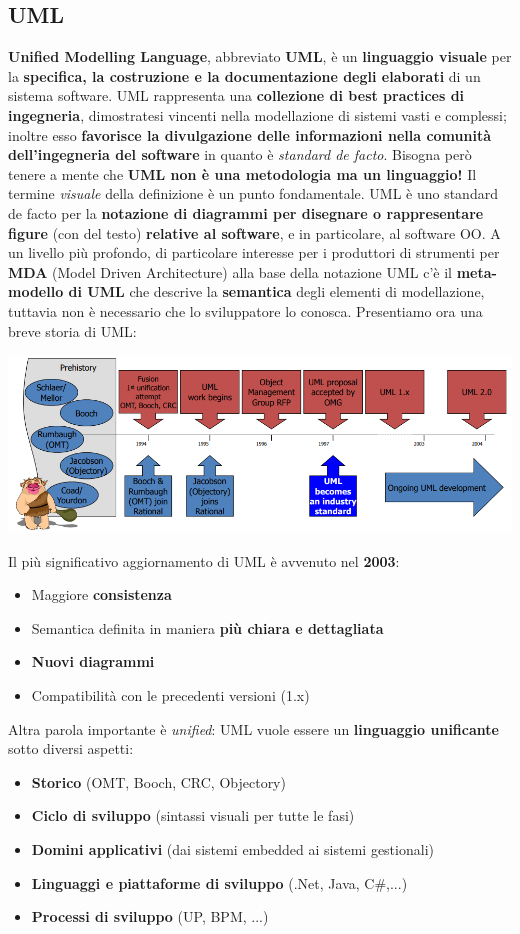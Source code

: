 \documentclass[12pt]{article}
\begin{document}
\subsection{UML}
\textbf{Unified Modelling Language}, abbreviato \textbf{UML}, è un \textbf{linguaggio visuale} per la \textbf{specifica, la costruzione e la documentazione degli elaborati} di un sistema software.
UML rappresenta una \textbf{collezione di best practices di ingegneria}, dimostratesi vincenti nella modellazione di sistemi vasti e complessi; inoltre esso \textbf{favorisce la divulgazione delle informazioni nella comunità dell'ingegneria del software} in quanto è \textit{standard de facto}.
Bisogna però tenere a mente che \textbf{UML non è una metodologia ma un linguaggio!} \newline
Il termine \textit{visuale} della definizione è un punto fondamentale. UML è uno standard de facto per la \textbf{notazione di diagrammi per disegnare o rappresentare figure} (con del testo) \textbf{relative al software}, e in particolare, al software OO.
A un livello più profondo, di particolare interesse per i produttori di strumenti per \textbf{MDA} (Model Driven Architecture) alla base della notazione UML c'è il \textbf{meta-modello di UML} che descrive la \textbf{semantica} degli elementi di modellazione, tuttavia non è necessario che lo sviluppatore lo conosca. 
Presentiamo ora una breve storia di UML:
\begin{center}
    \includegraphics[width = 1.05\textwidth]{Images/10.PNG}
\end{center}
Il più significativo aggiornamento di UML è avvenuto nel \textbf{2003}:
\begin{itemize}
    \item Maggiore \textbf{consistenza}
    \item Semantica definita in maniera \textbf{più chiara e dettagliata}
    \item \textbf{Nuovi diagrammi}
    \item Compatibilità con le precedenti versioni (1.x)
\end{itemize}
Altra parola importante è \textit{unified}: UML vuole essere un \textbf{linguaggio unificante} sotto diversi aspetti:
\begin{itemize}
    \item \textbf{Storico} (OMT, Booch, CRC, Objectory)
    \item \textbf{Ciclo di sviluppo} (sintassi visuali per tutte le fasi)
    \item \textbf{Domini applicativi} (dai sistemi embedded ai sistemi gestionali)
    \item \textbf{Linguaggi e piattaforme di sviluppo} (.Net, Java, C\#,...)
    \item \textbf{Processi di sviluppo} (UP, BPM, ...)
\end{itemize}
\end{document}
